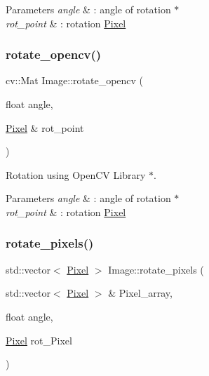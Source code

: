 \begin{DoxyParams}{Parameters}
{\em angle} & \+: angle of rotation $\ast$ \\
\hline
{\em rot\+\_\+point} & \+: rotation \hyperlink{class_pixel}{Pixel} \\
\hline
\end{DoxyParams}
\mbox{\label{class_image_ae18a138b9b7442a3429af2635afd8569}} 
\subsubsection{\texorpdfstring{rotate\+\_\+opencv()}{rotate\_opencv()}}
{\footnotesize\ttfamily cv\+::\+Mat Image\+::rotate\+\_\+opencv (\begin{DoxyParamCaption}\item[{float}]{angle,  }\item[{\hyperlink{class_pixel}{Pixel} \&}]{rot\+\_\+point }\end{DoxyParamCaption})}



Rotation using Open\+CV Library $\ast$. 


\begin{DoxyParams}{Parameters}
{\em angle} & \+: angle of rotation $\ast$ \\
\hline
{\em rot\+\_\+point} & \+: rotation \hyperlink{class_pixel}{Pixel} \\
\hline
\end{DoxyParams}
\mbox{\label{class_image_a1eaeac03912d7ec0e5a78e6e6035dc4f}} 
\subsubsection{\texorpdfstring{rotate\+\_\+pixels()}{rotate\_pixels()}}
{\footnotesize\ttfamily std\+::vector$<$ \hyperlink{class_pixel}{Pixel} $>$ Image\+::rotate\+\_\+pixels (\begin{DoxyParamCaption}\item[{std\+::vector$<$ \hyperlink{class_pixel}{Pixel} $>$ \&}]{Pixel\+\_\+array,  }\item[{float}]{angle,  }\item[{\hyperlink{class_pixel}{Pixel}}]{rot\+\_\+\+Pixel }\end{DoxyParamCaption})}


